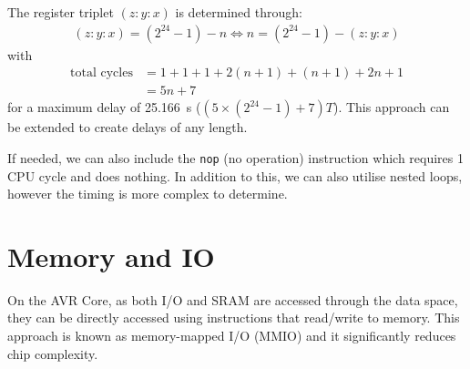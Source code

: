\documentclass[a4paper]{report}
\begin{document}
The register triplet \(\left( z:y:x \right)\) is determined through:
\begin{align*}
    \left( z:y:x \right) = \left( 2^{24} - 1 \right) - n \iff n = \left( 2^{24} - 1 \right) - \left( z:y:x \right)
\end{align*}
with
\begin{align*}
    \text{total cycles} & = 1 + 1 + 1 + 2 \left( n + 1 \right) + \left( n + 1 \right) + 2 n + 1 \\
                        & = 5n + 7
\end{align*}
for a maximum delay of \qty{25.166}{s} (\(\left(5 \times \left( 2^{24} - 1 \right) + 7 \right) T\)).
This approach can be extended to create delays of any length.

If needed, we can also include the \texttt{nop} (no operation) instruction which requires 1 CPU cycle and does nothing.
In addition to this, we can also utilise nested loops, however the timing is more complex to determine.
\section{Memory and IO}
On the AVR Core, as both I/O and SRAM are accessed through the data space, they can be
directly accessed using instructions that read/write to memory. This approach is known as memory-mapped I/O (MMIO)
and it significantly reduces chip complexity.
\end{document}
